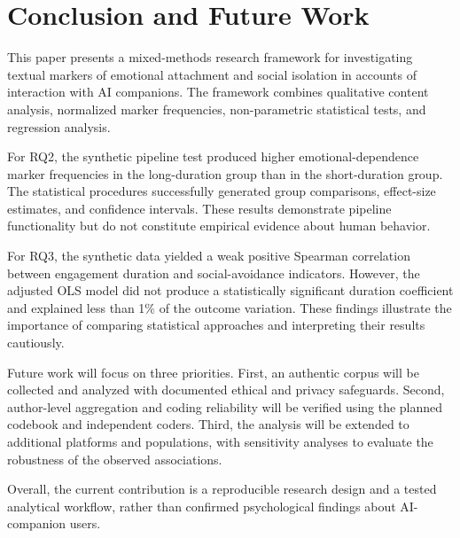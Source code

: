 
\section{Conclusion and Future Work}
\label{sec:conclusion}

This paper presents a mixed-methods research framework
for investigating textual markers of emotional attachment
and social isolation in accounts of interaction with
AI companions. The framework combines qualitative
content analysis, normalized marker frequencies,
non-parametric statistical tests, and regression analysis.

For RQ2, the synthetic pipeline test produced higher
emotional-dependence marker frequencies in the
long-duration group than in the short-duration group.
The statistical procedures successfully generated
group comparisons, effect-size estimates, and
confidence intervals. These results demonstrate
pipeline functionality but do not constitute
empirical evidence about human behavior.

For RQ3, the synthetic data yielded a weak positive
Spearman correlation between engagement duration
and social-avoidance indicators. However, the adjusted
OLS model did not produce a statistically significant
duration coefficient and explained less than 1\%
of the outcome variation. These findings illustrate
the importance of comparing statistical approaches
and interpreting their results cautiously.

Future work will focus on three priorities.
First, an authentic corpus will be collected and
analyzed with documented ethical and privacy safeguards.
Second, author-level aggregation and coding reliability
will be verified using the planned codebook and
independent coders. Third, the analysis will be
extended to additional platforms and populations,
with sensitivity analyses to evaluate the robustness
of the observed associations.

Overall, the current contribution is a reproducible
research design and a tested analytical workflow,
rather than confirmed psychological findings
about AI-companion users.
